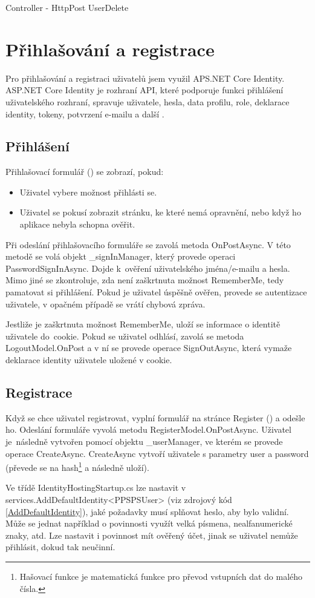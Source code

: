 \documentclass[a4paper, 12pt]{report}
\begin{document}
	\begin{listing}[H]
		\inputminted{csharp}{SourceCode/Controllers/Delete_Post.cs}
		\caption{Controller - HttpPost UserDelete}
		\label{Delete_Post}
	\end{listing}
	
	
	\chapter{Přihlašování a registrace}
	Pro přihlašování a registraci uživatelů jsem využil APS.NET Core Identity. ASP.NET Core Identity je rozhraní API, které podporuje funkci přihlášení uživatelského rozhraní, spravuje uživatele, hesla, data profilu, role, deklarace identity, tokeny, potvrzení e-mailu a další \cite{ASP.NET_Core_Identity}.\par

	\section{Přihlášení}
	Přihlašovací formulář () se zobrazí, pokud:
	\begin{itemize}
		\item Uživatel vybere možnost přihlásti se.
		\item Uživatel se pokusí zobrazit stránku, ke které nemá opravnění, nebo když ho aplikace nebyla schopna ověřit.
	\end{itemize}
	Při odeslání přihlašovacího formuláře se zavolá metoda OnPostAsync. V této metodě se volá objekt \_signInManager, který provede operaci PasswordSignInAsync. Dojde k~ověření uživatelského jména/e-mailu a hesla. Mimo jiné se zkontroluje, zda není zaškrtnuta možnost RememberMe, tedy pamatovat si přihlášení. Pokud je uživatel úspěšně ověřen, provede se autentizace uživatele, v opačném případě se vrátí chybová zpráva.\par
	Jestliže je zaškrtnuta možnost RememberMe, uloží se informace o identitě uživatele do~cookie. Pokud se uživatel odhlásí, zavolá se metoda LogoutModel.OnPost a v ní se provede operace SignOutAsync, která vymaže deklarace identity uživatele uložené v cookie.

	\section{Registrace}
	Když se chce uživatel registrovat, vyplní formulář na stránce Register () a odešle ho. Odeslání formuláře vyvolá metodu RegisterModel.OnPostAsync. Uživatel je~následně vytvořen pomocí objektu \_userManager, ve kterém se provede operace CreateAsync. CreateAsync vytvoří uživatele s parametry user a password (převede se na hash\footnote{Hašovací funkce je matematická funkce pro převod vstupních dat do malého čísla.\cite{Hash}} a následně uloží).\par
	Ve třídě IdentityHostingStartup.cs lze nastavit v services.AddDefaultIdentity<PPSPSUser> (viz zdrojový kód \ref{AddDefaultIdentity}), jaké požadavky musí splňovat heslo, aby bylo validní. Může se jednat například o povinnosti využít velká písmena, nealfanumerické znaky, atd. Lze nastavit i povinnost mít ověřený účet, jinak se uživatel nemůže přihlásit, dokud tak neučinní.
\end{document}
